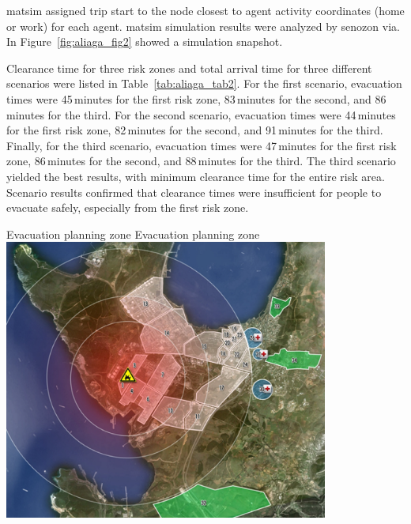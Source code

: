 \gls{matsim} assigned trip start to the node closest to agent activity coordinates (\ie home or work) for each agent.  \gls{matsim} simulation results were analyzed by \gls{senozon} \gls{via}. In Figure~\ref{fig:aliaga_fig2} showed a simulation snapshot.

Clearance time for three risk zones and total arrival time for three different scenarios were listed in Table~\ref{tab:aliaga_tab2}. For the first scenario, evacuation times were 45\,minutes for the first risk zone, 83\,minutes for the second, and 86\,minutes for the third. For the second scenario, evacuation times were 44\,minutes for the first risk zone, 82\,minutes for the second, and 91\,minutes for the third. Finally, for the third scenario, evacuation times were 47\,minutes for the first risk zone, 86\,minutes for the second, and 88\,minutes for the third. The third scenario yielded the best results, with minimum clearance time for the entire risk area. Scenario results confirmed that clearance times were insufficient for people to evacuate safely, especially from the first risk zone.


\createfigure%
{Evacuation planning zone}%
{Evacuation planning zone}%
{\label{fig:aliaga_fig1}}%
{\includegraphics[width=0.8\textwidth, angle=0]{scenarios/figures/aliaga_fig1.png}}%
{}


